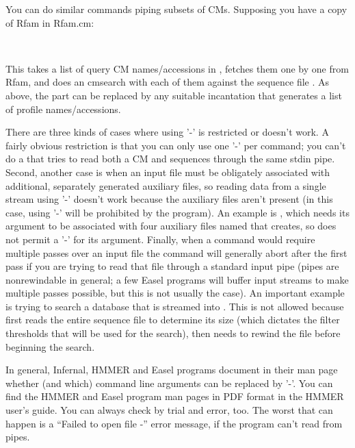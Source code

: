 You can do similar commands piping subsets of CMs. Supposing you have a copy of Rfam in Rfam.cm:

 \\ 

This takes a list of query CM names/accessions in
, fetches them one by one from Rfam, and does an
cmsearch with each of them against the sequence file
. As above, the  part
can be replaced by any suitable incantation that generates a list of
profile names/accessions.

There are three kinds of cases where using '-' is restricted or
doesn't work. A fairly obvious restriction is that you can only use
one '-' per command; you can't do a  that tries to
read both a CM and sequences through the same stdin
pipe. Second, another case is when an input file must be obligately
associated with additional, separately generated auxiliary files, so
reading data from a single stream using '-' doesn't work because the
auxiliary files aren't present (in this case, using '-' will be
prohibited by the program). An example is , which needs
its  argument to be associated with four auxiliary
files named  that  creates,
so  does not permit a '-' for its 
argument. Finally, when a command would require multiple passes over
an input file the command will generally abort after the first pass
if you are trying to read that file through a standard input pipe
(pipes are nonrewindable in general; a few Easel programs
will buffer input streams to make multiple passes possible, but this
is not usually the case). An important example is trying to search a
database that is streamed into . This is not allowed
because  first reads the entire sequence file to
determine its size (which dictates the filter thresholds that will be
used for the search), then needs to rewind the file before beginning
the search.

In general, Infernal, HMMER and Easel programs document in their man
page whether (and which) command line arguments can be replaced by
'-'.  You can find the HMMER and Easel program man pages in PDF format
in the HMMER user's guide\cite{hmmer3guide}.  You can always check by
trial and error, too. The worst that can happen is a ``Failed to open
file -'' error message, if the program can't read from pipes.
